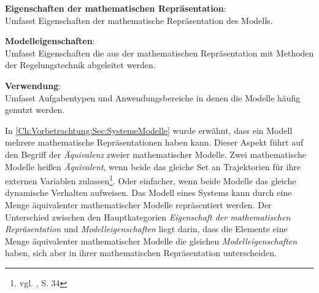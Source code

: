 \textbf{Eigenschaften der mathematischen Repräsentation}: \\
Umfasst Eigenschaften der mathematische Repräsentation des Modells.   %

\textbf{Modelleigenschaften}: \\ %
Umfasst Eigenschaften die aus der mathematischen Repräsentation mit Methoden der Regelungstechnik abgeleitet werden.

\textbf{Verwendung}: \\
Umfasst Aufgabentypen und Anwendungsbereiche in denen die Modelle häufig genutzt werden.

In \ref{Ch:Vorbetrachtung:Sec:SystemeModelle} wurde erwähnt, dass ein Modell mehrere mathematische Repräsentationen haben kann. Dieser Aspekt führt auf den Begriff der \textit{Äquivalenz} zweier mathematischer Modelle. Zwei mathematische Modelle heißen \textit{Äquivalent}, wenn beide das gleiche Set an Trajektorien für ihre externen Variablen zulassen\footnote{vgl. \cite{SCH89}, S. 34}. Oder einfacher, wenn beide Modelle das gleiche dynamische Verhalten aufweisen. Das Modell eines Systems kann durch eine Menge äquivalenter mathematischer Modelle repräsentiert werden. Der Unterschied zwischen den Hauptkategorien \textit{Eigenschaft der mathematischen Repräsentation} und \textit{Modelleigenschaften} liegt darin, dass die Elemente eine Menge äquivalenter mathematischer Modelle die gleichen \textit{Modelleigenschaften} haben, sich aber in ihrer mathematischen Repräsentation unterscheiden.

